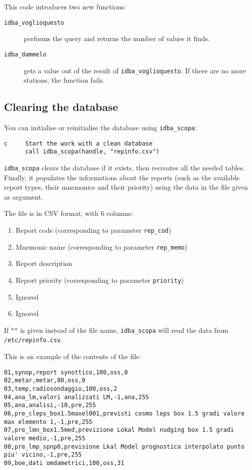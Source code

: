 \documentclass[draft,12pt,a4paper,twoside]{book}
\begin{document}
This code introduces two new functions:

\begin{description}
\item[{\tt idba\_voglioquesto}]
  performs the query and returns the number of values it finds.
\item[{\tt idba\_dammelo}]
  gets a value out of the result of {\tt idba\_voglioquesto}.  If there are no
  more stations, the function fails.
\end{description}

\subsection {Clearing the database}

You can initialise or reinitialise the database using {\tt idba\_scopa}:
\label{fun-idba_scopa}

\begin{verbatim}
c     Start the work with a clean database
      call idba_scopa(handle, "repinfo.csv")
\end{verbatim}

{\tt idba\_scopa} clears the database if it exists, then recreates all the
needed tables.  Finally, it populates the informations about the reports (such
as the available report types, their mnemonics and their priority) using the
data in the file given as argument.

The file is in CSV format, with 6 columns:
\begin{enumerate}
\item Report code (corresponding to parameter {\tt rep\_cod})
\item Mnemonic name (corresponding to parameter {\tt rep\_memo})
\item Report description
\item Report priority (corresponding to parameter {\tt priority})
\item Ignored
\item Ignored
\end{enumerate}

If {\tt ""} is given instead of the file name, {\tt idba\_scopa} will read the
data from {\tt /etc/repinfo.csv}.

This is an example of the contents of the file:

\begin{verbatim}
01,synop,report synottico,100,oss,0
02,metar,metar,80,oss,0
03,temp,radiosondaggio,100,oss,2
04,ana_lm,valori analizzati LM,-1,ana,255
05,ana,analisi,-10,pre,255
06,pre_cleps_box1.5maxel001,previsti cosmo leps box 1.5 gradi valore max elemento 1,-1,pre,255
07,pre_lmn_box1.5med,previzione Lokal Model nudging box 1.5 gradi valore medio,-1,pre,255
08,pre_lmp_spnp0,previsione Lkal Model prognostica interpolato punto piu' vicino,-1,pre,255
09,boe,dati omdametrici,100,oss,31
\end{verbatim}
\end{document}
